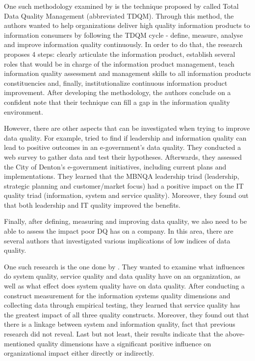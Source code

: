 \documentclass{mprop}
\begin{document}
One such methodology examined by \citet{pipino2002data} is the technique 
proposed by \citet{wang1998product} called Total Data Quality Management
(abbreviated TDQM). Through this method, the authors wanted to help 
organizations deliver high quality information products to information
consumers by following the TDQM cycle - define, measure, analyse and improve
information quality continuously. In order to do that, the research proposes
4 steps: clearly articulate the information product, establish several roles
that would be in charge of the information product management, teach information
quality assessment and management skills to all information products 
constituencies and, finally, institutionalize continuous information product 
improvement. After developing the methodology, the authors conclude on a 
confident note that their technique can fill a gap in the information quality
environment.

However, there are other aspects that can be investigated when trying to improve
data quality. For example, \citet{prybutok2008evaluating} tried to find if 
leadership and information quality can lead to positive outcomes in an 
e-government's data quality. They conducted a web survey to gather data and test 
their hypotheses. Afterwards, they assessed the City of Denton's e-government 
initiatives, including current plans and implementations. They learned that the 
MBNQA leadership triad (leadership, strategic planning and customer/market focus) 
had a positive impact on the IT quality triad (information, system and service 
quality). Moreover, they found out that both leadership and IT quality improved 
the benefits.

Finally, after defining, measuring and improving data quality, we also need
to be able to assess the impact poor DQ has on a company. In this area, there
are several authors that investigated various implications of low indices
of data quality.

One such research is the one done by \citet{gorla2010organizational}. They wanted
to examine what influences do system quality, service quality and data quality
have on an organization, as well as what effect does system quality have on
data quality. After conducting a construct measurement for the information
systems quality dimensions \citep{swanson1997maintaining} and collecting data
through empirical testing, they learned that service quality has the greatest
impact of all three quality constructs. Moreover, they found out that there is 
a linkage between system and information quality, fact that previous research
did not reveal. Last but not least, their results indicate that the 
above-mentioned quality dimensions have a significant positive influence on 
organizational impact either directly or indirectly. 
\end{document}

